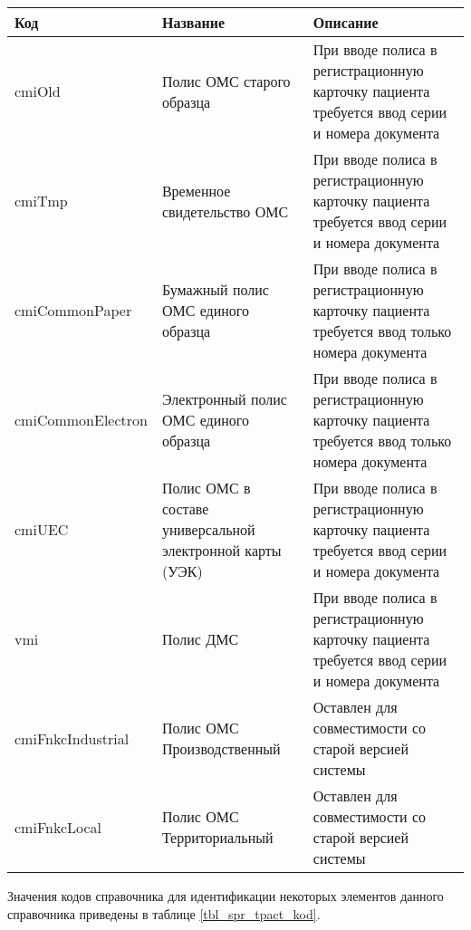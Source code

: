 {\small
\begin{table}[ht!]
 \label{tbl_spr_polis_kod} 
 \begin{tabular}{|p{4.3 cm}|p{4.4cm}|p{7.9cm}|}
  \hline \rule{0pt}{15pt} \centering \textbf{Код} & \centering \textbf{Название} & \hfil \textbf{Описание} \\ \hline
  cmiOld &	Полис ОМС старого образца	& При вводе полиса в регистрационную карточку пациента требуется ввод серии и номера документа \\ \hline
  cmiTmp &	Временное свидетельство ОМС	& При вводе полиса в регистрационную карточку пациента требуется ввод серии и номера документа \\ \hline
  cmiCommonPaper &	Бумажный полис ОМС единого образца & 	При вводе полиса в регистрационную карточку пациента требуется ввод только номера документа \\ \hline
  cmiCommonElectron	& Электронный полис ОМС единого образца	& При вводе полиса в регистрационную карточку пациента требуется ввод только номера документа \\ \hline
  cmiUEC	& Полис ОМС в составе универсальной электронной карты (УЭК) & При вводе полиса в регистрационную карточку пациента требуется ввод серии и номера документа \\ \hline
  vmi	& Полис ДМС	& При вводе полиса в регистрационную карточку пациента требуется ввод серии и номера документа \\ \hline
  cmiFnkcIndustrial	& Полис ОМС Производственный & Оставлен для совместимости со старой версией системы \\ \hline
  cmiFnkcLocal	& Полис ОМС Территориальный	& Оставлен для совместимости со старой версией системы \\ \hline
 \end{tabular}
\end{table}
}

Значения кодов справочника  для идентификации некоторых элементов данного справочника приведены в таблице \ref{tbl_spr_tpact_kod}.

